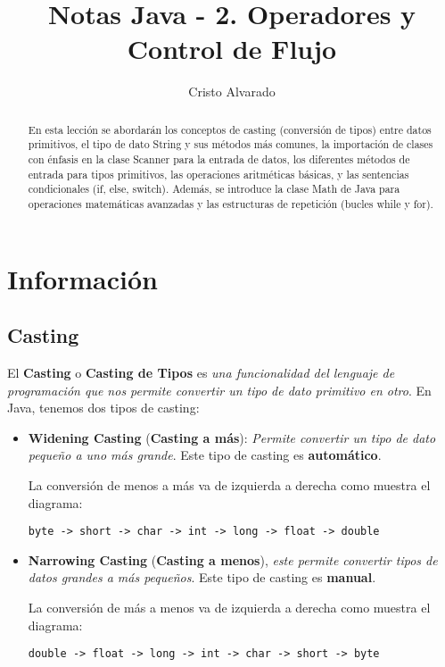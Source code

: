 \documentclass[12pt]{article}
\newcounter{it}
\theoremstyle{largebreak}
\begin{document}
    \setlength{\parskip}{5pt}
    \setlength{\parindent}{12pt}
    \title{Notas Java - 2. Operadores y Control de Flujo}
    \author{Cristo Alvarado}
    \maketitle

    \begin{abstract}
        En esta lección se abordarán los conceptos de casting (conversión de tipos) entre datos primitivos, el tipo de dato String y sus métodos más comunes, la importación de clases con énfasis en la clase Scanner para la entrada de datos, los diferentes métodos de entrada para tipos primitivos, las operaciones aritméticas básicas, y las sentencias condicionales (if, else, switch). Además, se introduce la clase Math de Java para operaciones matemáticas avanzadas y las estructuras de repetición (bucles while y for).
    \end{abstract}
    
    \tableofcontents

    \lstlistoflistings

    \section{Información}

    \subsection{Casting}

    \begin{mydef}
        El \textbf{Casting} o \textbf{Casting de Tipos} es \textit{una funcionalidad del lenguaje de programación que nos permite convertir un tipo de dato primitivo en otro}. En Java, tenemos dos tipos de casting:
        \begin{itemize}
            \item \textbf{Widening Casting} (\textbf{Casting a más}): \textit{Permite convertir un tipo de dato pequeño a uno más grande}. Este tipo de casting es \textbf{automático}.
            
            La conversión de menos a más va de izquierda a derecha como muestra el diagrama:
            \begin{center}
                \texttt{byte -> short -> char -> int -> long -> float -> double}
            \end{center}
            \item \textbf{Narrowing Casting} (\textbf{Casting a menos}), \textit{este permite convertir tipos de datos grandes a más pequeños}. Este tipo de casting es \textbf{manual}.
            
            La conversión de más a menos va de izquierda a derecha como muestra el diagrama:
            \begin{center}
                \texttt{double -> float -> long -> int -> char -> short -> byte}
            \end{center}
        \end{itemize}
    \end{mydef}
\end{document}
